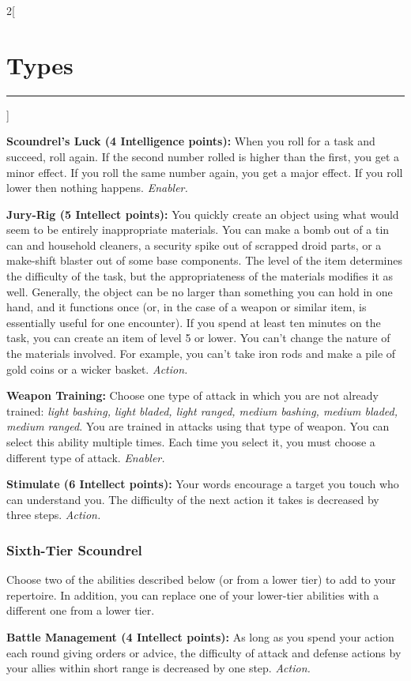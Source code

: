 \documentclass[a4paper,10pt,final]{book}
\newcommand{\HRule}{\rule{\linewidth}{0.5mm}} %
\newcommand{\newSection}[1]{\section*{#1} \addcontentsline{toc}{section}{#1} \label{sec:#1} \HRule}
\newcommand{\itemAbility}[2]{\textcolor{25gray}{\textbullet\textbf{ #1:}} {#2}\par}
\newcommand{\enabler}{\textit{ Enabler.}}
\newcommand{\action}{\textit{ Action.}}
\newenvironment{docsection}[1]
{
  \begin{multicols*}{2}[\newSection{#1}]
}
{
  \end{multicols*}
  \newpage
}
\begin{document}
\begin{docsection}{Types}
\itemAbility{Scoundrel's Luck (4 Intelligence points)}{When
you roll for a task and succeed, roll again. If
the second number rolled is higher than the
first, you get a minor effect. If you roll the
same number again, you get a major effect. 
If you roll lower then nothing happens.
\enabler}

\itemAbility{Jury-Rig (5 Intellect points)}{You quickly
create an object using what would seem to be entirely inappropriate materials.
You can make a bomb out of a tin can
and household cleaners, a security spike out
of scrapped droid parts, or a make-shift blaster out of
some base components. The level of the item
determines the difficulty of the task, but the
appropriateness of the materials modifies
it as well. Generally, the object can be no
larger than something you can hold in one
hand, and it functions once (or, in the case
of a weapon or similar item, is essentially
useful for one encounter). If you spend
at least ten minutes on the task, you can
create an item of level 5 or lower. You can’t
change the nature of the materials involved.
For example, you can’t take iron rods and
make a pile of gold coins or a wicker basket.\action}

\itemAbility{Weapon Training}{Choose one type of attack in which you are not already trained: \textit{light bashing, light bladed, light ranged, medium bashing, medium bladed, medium ranged}. You are trained in attacks using that type of weapon. You can select this ability multiple times. Each time you select it, you must choose a different type of attack.\enabler}

\itemAbility{Stimulate (6 Intellect points)}{Your words
encourage a target you touch who can
understand you. The difficulty of the next
action it takes is decreased by three steps.\action}


\subsubsection*{Sixth-Tier Scoundrel}
\label{subsub:scoundrelSixthTier}

Choose two of the abilities described
below (or from a lower tier) to add to your
repertoire. In addition, you can replace one
of your lower-tier abilities with a different
one from a lower tier. \par

\itemAbility{Battle Management (4 Intellect points)}{As long as you spend your action each
round giving orders or advice, the difficulty
of attack and defense actions by your allies
within short range is decreased by one step.\action}


\end{docsection}
\end{document}
